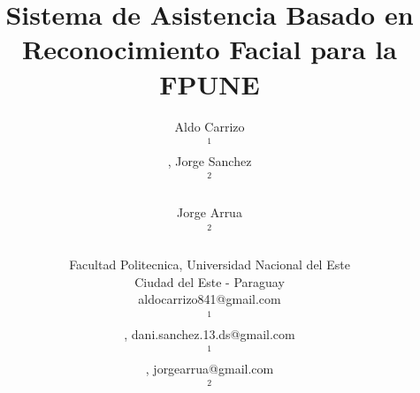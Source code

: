 \documentclass[10pt,a4paper]{article}
\begin{document}
\renewcommand{\tablename}{Tabla}
\renewcommand{\refname}{Referencias bibliográficas.}
\vspace{1cm}
\title{Sistema de Asistencia Basado en Reconocimiento Facial para la FPUNE}
\vspace{1cm}

\author{
    {\small Aldo Carrizo}\begin{scriptsize}$^{1}$\end{scriptsize},
    {\small Jorge Sanchez}\begin{scriptsize}$^{2}$\end{scriptsize}\\
    {\small Jorge Arrua}\begin{scriptsize}$^{2}$\end{scriptsize}\\
    {\small Facultad Politecnica, Universidad Nacional del Este}\\
    {\small Ciudad del Este - Paraguay}\\
    {\small aldocarrizo841@gmail.com}\begin{scriptsize}$^{1}$\end{scriptsize},
    {\small dani.sanchez.13.ds@gmail.com}\begin{scriptsize}$^{1}$\end{scriptsize},
    {\small jorgearrua@gmail.com}\begin{scriptsize}$^{2}$\end{scriptsize}
}
\date{}
\maketitle

\vspace*{-1cm}
\end{document}
